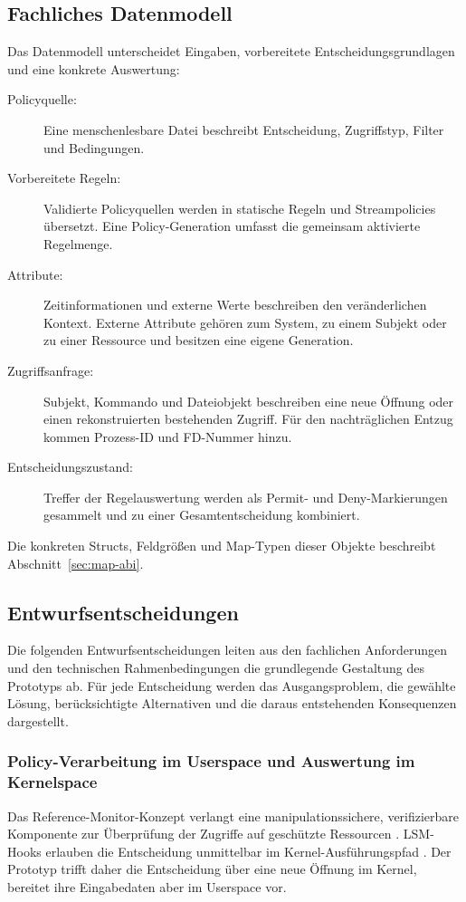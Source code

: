 \subsection{Fachliches Datenmodell}
Das Datenmodell unterscheidet Eingaben, vorbereitete Entscheidungsgrundlagen und eine konkrete Auswertung:
\begin{description}
    \item[Policyquelle:] Eine menschenlesbare Datei beschreibt Entscheidung, Zugriffstyp, Filter und Bedingungen.
    \item[Vorbereitete Regeln:] Validierte Policyquellen werden in statische Regeln und Streampolicies übersetzt. Eine Policy-Generation umfasst die gemeinsam aktivierte Regelmenge.
    \item[Attribute:] Zeitinformationen und externe Werte beschreiben den veränderlichen Kontext. Externe Attribute gehören zum System, zu einem Subjekt oder zu einer Ressource und besitzen eine eigene Generation.
    \item[Zugriffsanfrage:] Subjekt, Kommando und Dateiobjekt beschreiben eine neue Öffnung oder einen rekonstruierten bestehenden Zugriff. Für den nachträglichen Entzug kommen Prozess-ID und FD-Nummer hinzu.
    \item[Entscheidungszustand:] Treffer der Regelauswertung werden als Permit- und Deny-Markierungen gesammelt und zu einer Gesamtentscheidung kombiniert.
\end{description}
Die konkreten Structs, Feldgrößen und Map-Typen dieser Objekte beschreibt Abschnitt~\ref{sec:map-abi}.

\subsection{Entwurfsentscheidungen}

Die folgenden Entwurfsentscheidungen leiten aus den fachlichen Anforderungen und den technischen
Rahmenbedingungen die grundlegende Gestaltung des Prototyps ab. Für jede Entscheidung werden das
Ausgangsproblem, die gewählte Lösung, berücksichtigte Alternativen und die daraus entstehenden
Konsequenzen dargestellt.

\subsubsection{Policy-Verarbeitung im Userspace und Auswertung im Kernelspace}\label{sec:entscheidung-userspace-kernelspace}
Das Reference-Monitor-Konzept verlangt eine manipulationssichere, verifizierbare Komponente zur Überprüfung der Zugriffe auf geschützte Ressourcen \cite[Abschnitt~3.4]{anderson1972computer}. LSM-Hooks erlauben die Entscheidung unmittelbar im Kernel-Ausführungspfad \citep{wright2002linux}. Der Prototyp trifft daher die Entscheidung über eine neue Öffnung im Kernel, bereitet ihre Eingabedaten aber im Userspace vor.

